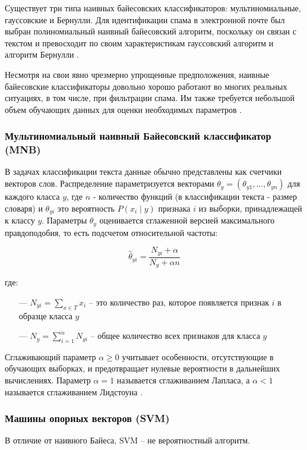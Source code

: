 Существует три типа наивных байесовских классификаторов: мультиномиальные,
гауссовские и Бернулли. Для идентификации спама в электронной почте
был выбран полиномиальный наивный байесовский алгоритм, поскольку он
связан с текстом и превосходит по своим характеристикам гауссовский
алгоритм и алгоритм Бернулли \cite{IEEE}.

Несмотря на свои явно чрезмерно упрощенные предположения,
наивные байесовские классификаторы довольно хорошо работают
во многих реальных ситуациях, в том числе, при фильтрации
спама. Им также требуется небольшой объем обучающих
данных для оценки необходимых параметров \cite{scikitMNB}.

\subsubsection{Мультиномиальный наивный Байесовский классификатор (MNB)}
В задачах классификации текста данные обычно представлены как счетчики векторов слов.
Распределение параметризуется векторами $\theta_y = (\theta_{y1},\ldots,\theta_{yn})$
для каждого класса ${y}$, где ${n}$ - количество функций (в
классификации текста - размер словаря) и $\theta_{yi}$ это вероятность
$P(x_i \mid y)$ признака ${i}$ из выборки, принадлежащей к классу ${y}$.
Параметры $\theta_y$ оценивается сглаженной версией максимального правдоподобия,
то есть подсчетом относительной частоты:

\begin{equation}\label{eq4}
    \hat{\theta}_{yi} = \frac{ N_{yi} + \alpha}{N_y + \alpha n}
\end{equation}

где:
\begin{itemize}
    \item[—] $N_{yi} = \sum_{x \in T} x_i$ -- это количество раз,
        которое появляется признак ${i}$ в образце класса ${y}$
    \item[—] $N_{y} = \sum_{i=1}^{n} N_{yi}$ -- общее количество всех признаков для класса ${y}$
\end{itemize}

Сглаживающий параметр $\alpha \ge 0$ учитывает особенности, отсутствующие
в обучающих выборках, и предотвращает нулевые вероятности в дальнейших
вычислениях. Параметр $\alpha = 1$ называется сглаживанием Лапласа, а $\alpha < 1$
называется сглаживанием Лидстоуна \cite{scikitMNB}.

\subsubsection{Машины опорных векторов (SVM)}
В отличие от наивного Байеса, SVM -- не вероятностный алгоритм.

